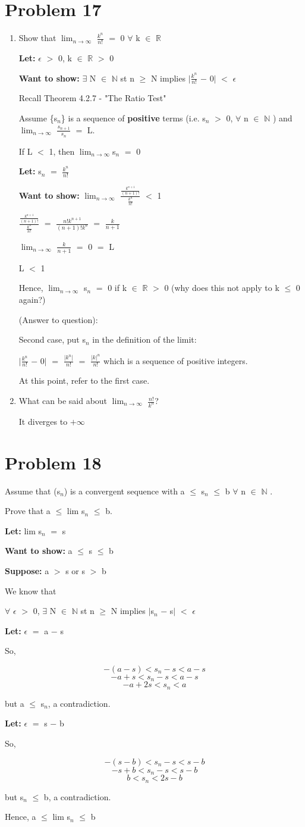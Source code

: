 \documentclass{article}
\newcommand{\mt}[1]{\ensuremath{#1}}
\newcommand\bsc[2][\DefaultOpt]{%
  \def\DefaultOpt{#2}%
  \section[#1]{#2}%
}
\newcommand{\balist}{\begin{enumerate}[label=\alph*.]}
\newcommand{\elist}{\end{enumerate}}
\newcommand{\lt}[1]{\textbf{Let: } #1}
\newcommand{\supp}[1]{\textbf{Suppose: } #1}
\newcommand{\wts}[1]{\textbf{Want to show: } #1}
\newcommand{\br}{\mt{\mathbb{R}} }       %
\newcommand{\bn}{\mt{\mathbb{N}} }       %
\newcommand{\ep}{\mt{\epsilon} }         %
\newcommand{\fa}{\mt{\forall} }          %
\newcommand{\mem}{\mt{\in} }
\newcommand{\exs}{\mt{\exists} }
\newcommand{\av}[1]{\mt{|}#1\mt{|}}  %
\newcommand{\prn}[1]{(#1)}
\newcommand{\bk}[1]{\{#1\}}
\newcommand{\ps}{\mt{+} }
\newcommand{\ms}{\mt{-} }
\newcommand{\ls}{\mt{<} }
\newcommand{\gr}{\mt{>} }
\newcommand{\lse}{\mt{\leq} }
\newcommand{\gre}{\mt{\geq} }
\newcommand{\eql}{\mt{=} }
\newcommand{\uw}[2]{#1\mt{_{#2}}}
\newcommand{\frc}[2]{\mt{\frac{#1}{#2}}}
\newcommand{\lmti}[1]{\mt{\displaystyle{\lim_{#1 \to \infty}}}}
\newcommand{\eqn}[1]{\[#1\]}
\begin{document}
\bsc{Problem 17}{
\balist
\item Show that \lmti{n} \frc{k^n}{n!} \eql 0 \fa k \mem \br
	
	\lt{\ep \gr 0, k \mem \br \gr 0}
	
	\wts{\exs N \mem \bn st n \gre N implies \av{\frc{k^n}{n!} \ms 0} \ls \ep}
	
	Recall Theorem 4.2.7 - "The Ratio Test"
	
	Assume \bk{\uw{s}{n}} is a sequence of \textbf{positive} terms (i.e. \uw{s}{n} \gr 0, \fa n \mem \bn) and \lmti{n} \frc{\uw{s}{n \ps 1}}{\uw{s}{n}} \eql L.
		
	If L \ls 1, then \lmti{n}\uw{s}{n} \eql 0
	
	\lt{\uw{s}{n} \eql \frc{k^n}{n!}}
	
	\wts{\lmti{n} \frc{\frc{k^{n + 1}}{{(n + 1)}!}}{\frc{k^n}{n!}} \ls 1}
	
	\frc{\frc{k^{n + 1}}{{(n + 1)}!}}{\frc{k^n}{n!}} \eql \frc{n!k^{n + 1}}{(n + 1)!k^n} \eql \frc{k}{n \ps 1}
	
	\lmti{n} \frc{k}{n + 1} \eql 0 \eql L
	
	L \ls 1
	
	Hence, \lmti{n} \uw{s}{n} \eql 0 if k \mem \br \gr 0 (why does this not apply to k \lse 0 again?)
	
	(Answer to question):
	
	Second case, put \uw{s}{n} in the definition of the limit:
	
	\av{\frc{k^n}{n!} \ms 0} \eql \frc{\av{k^n}}{n!} \eql \frc{\av{k}^n}{n!} which is a sequence of positive integers.
	
	At this point, refer to the first case.

\item What can be said about \lmti{n} \frc{n!}{k^n}?
	
	It diverges to $+\infty$
\elist
}

\bsc{Problem 18}{
Assume that \prn{\uw{s}{n}} is a convergent sequence with a \lse \uw{s}{n} \lse b \fa n \mem \bn.

Prove that a \lse lim \uw{s}{n} \lse b.

\lt{lim \uw{s}{n} \eql s}

\wts{a \lse s \lse b}

\supp{a \gr s or s \gr b}

We know that 

\fa \ep \gr 0, \exs N \mem \bn st n \gre N implies \av{\uw{s}{n} \ms s} \ls \ep

\lt{\ep \eql a \ms s}

So,

\eqn{-(a - s) \ls \uw{s}{n} - s \ls a - s}
\eqn{-a + s \ls \uw{s}{n} - s \ls a - s }
\eqn{-a + 2s \ls \uw{s}{n} \ls a}

but a \lse \uw{s}{n}, a contradiction.

\lt{\ep \eql s \ms b}

So,

\eqn{-(s - b) \ls \uw{s}{n} - s \ls s - b}
\eqn{-s + b \ls \uw{s}{n} - s \ls s - b}
\eqn{b \ls \uw{s}{n} \ls 2s - b}

but \uw{s}{n} \lse b, a contradiction.

Hence, a \lse lim \uw{s}{n} \lse b

}
\end{document}
